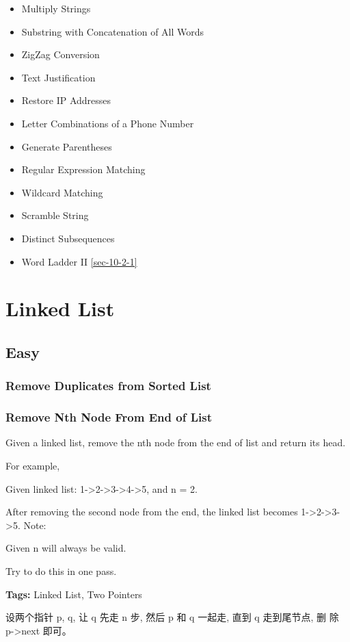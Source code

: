 \documentclass[12pt]{book}
\begin{document}
\begin{itemize}
\item Multiply Strings
\item Substring with Concatenation of All Words
\item ZigZag Conversion
\item Text Justification
\item Restore IP Addresses

\item Letter Combinations of a Phone Number
\item Generate Parentheses
\item Regular Expression Matching
\item Wildcard Matching
\item Scramble String
\item Distinct Subsequences
\item Word Ladder II \ref{sec-10-2-1}
\end{itemize}
\chapter{Linked List}
\label{sec-3}
\section{Easy}
\label{sec-3-1}
\subsection{Remove Duplicates from Sorted List}
\label{sec-3-1-1}
\subsection{Remove Nth Node From End of List}
\label{sec-3-1-2}

Given a linked list, remove the nth node from the end of list and return its head.

For example,

Given linked list: 1->2->3->4->5, and n = 2.

   After removing the second node from the end, the linked list becomes 1->2->3->5.
Note:

Given n will always be valid.

Try to do this in one pass.

\textbf{Tags:} Linked List, Two Pointers

设两个指针 p,  q, 让 q 先走 n 步, 然后 p 和 q 一起走, 直到 q 走到尾节点, 删
除 p->next 即可。
\end{document}

